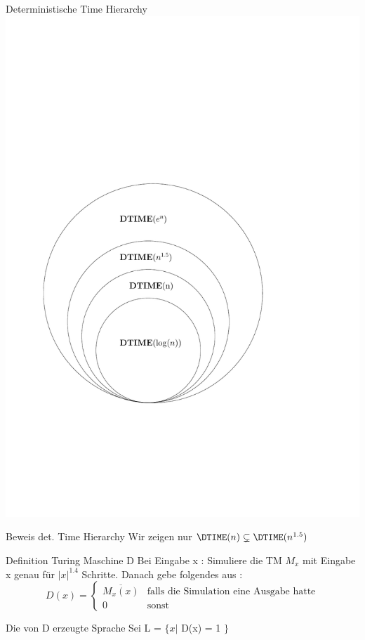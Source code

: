 \begin{frame}{Deterministische Time Hierarchy}
	\includegraphics[scale=0.5]{images/timehierarchy.pdf}
\end{frame}

\begin{frame}{Beweis det. Time Hierarchy}
	Wir zeigen nur $\DTIME(n) \subsetneq \DTIME(n^{1.5})$
	\pause
	\begin{block}{Definition Turing Maschine D} 
		Bei Eingabe x : Simuliere die TM $M_x$ mit Eingabe x genau für $|x|^{1.4}$ 						Schritte. Danach gebe folgendes aus :
		\begin{equation}
		D(x) = 
		\begin{cases}
			\overline{M_x(x)} & \text{falls die Simulation eine Ausgabe hatte} \\
			0 & \text{sonst}
			
		\end{cases}
		\end{equation}			
	\end{block}
	
	\pause	
	
	\begin{block}{Die von D erzeugte Sprache}
		Sei L = $ \lbrace x \vert$ D(x) = 1 $ \rbrace$
	\end{block}
\end{frame}

